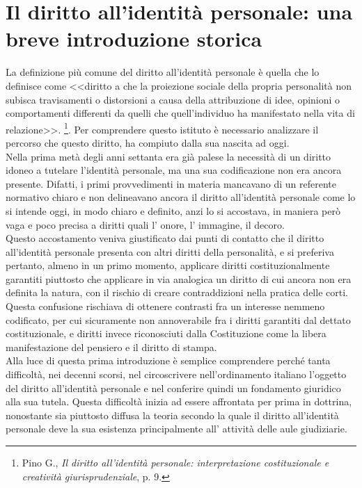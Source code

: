 \section{Il diritto all'identità personale: una breve introduzione storica}
La definizione più comune del diritto all'identità personale è quella che lo definisce come <<diritto a che la proiezione sociale della propria personalità non subisca travisamenti
o distorsioni a causa della attribuzione di idee, opinioni o comportamenti differenti da quelli che quell’individuo ha manifestato nella vita di relazione>>.
\footnote{Pino G.,\textit{ Il diritto all'identità personale: interpretazione costituzionale e creatività giurisprudenziale}, p. 9.}.
Per comprendere questo istituto è necessario analizzare il percorso che questo diritto,
ha compiuto dalla sua nascita ad oggi.
\\Nella prima metà degli anni settanta era già palese la necessità di un diritto idoneo a tutelare l'identità personale, ma una sua codificazione non era ancora presente. Difatti, i primi provvedimenti in materia mancavano di un referente normativo chiaro e non delineavano ancora il diritto all’identità personale come lo si intende oggi, in modo chiaro e definito, anzi lo si accostava, in maniera però vaga e poco precisa a diritti quali l' onore, l' immagine, il decoro.
\\Questo accostamento veniva giustificato dai punti di contatto che il diritto all'identità personale presenta con altri diritti della personalità, e si preferiva pertanto, almeno in un primo momento, applicare diritti costituzionalmente garantiti piuttosto che applicare in via analogica un diritto di cui ancora non era definita la natura, con il rischio di creare contraddizioni nella pratica delle corti.
Questa confusione rischiava di ottenere contrasti fra un interesse nemmeno codificato, per cui sicuramente non annoverabile fra i diritti garantiti dal dettato costituzionale, e diritti invece riconosciuti dalla Costituzione come la libera manifestazione del pensiero e il diritto di stampa. 
\\Alla luce di questa prima introduzione è semplice comprendere perché tanta difficoltà, nei decenni scorsi, nel circoscrivere nell’ordinamento italiano l’oggetto del diritto all’identità personale e nel conferire quindi un fondamento giuridico alla sua tutela. 
Questa difficoltà inizia ad essere affrontata per prima in dottrina, nonostante sia piuttosto diffusa la teoria secondo la quale il diritto all'identità personale deve la sua esistenza principalmente all' attività delle aule giudiziarie. 
